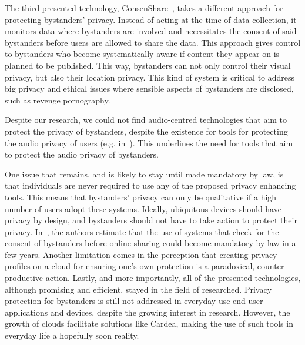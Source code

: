 \documentclass[conference]{IEEEtran}
\begin{document}
The third presented technology, ConsenShare~\cite{olteanu2018consensual}, takes a different approach for protecting bystanders' privacy. Instead of acting at the time of data collection, it monitors data where bystanders are involved and necessitates the consent of said bystanders before users are allowed to share the data. This approach gives control to bystanders who become systematically aware if content they appear on is planned to be published. This way, bystanders can not only control their visual privacy, but also their location privacy. This kind of system is critical to address big privacy and ethical issues where sensible aspects of bystanders are disclosed, such as revenge pornography. 

Despite our research, we could not find audio-centred technologies that aim to protect the privacy of bystanders, despite the existence for tools for protecting the audio privacy of users (e.g. in~\cite{larson2011accurate, ahmed2020preech}). This underlines the need for tools that aim to protect the audio privacy of bystanders. 

One issue that remains, and is likely to stay until made mandatory by law, is that individuals are never required to use any of the proposed privacy enhancing tools. This means that bystanders' privacy can only be qualitative if a high number of users adopt these systems. Ideally, ubiquitous devices should have privacy by design, and bystanders should not have to take action to protect their privacy. In~\cite{olteanu2018consensual}, the authors estimate that the use of systems that check for the consent of bystanders before online sharing could become mandatory by law in a few years. Another limitation comes in the perception that creating privacy profiles on a cloud for ensuring one's own protection is a paradoxical, counter-productive action. Lastly, and more importantly, all of the presented technologies, although promising and efficient, stayed in the field of researched. Privacy protection for bystanders is still not addressed in everyday-use end-user applications and devices, despite the growing interest in research. However, the growth of clouds facilitate solutions like Cardea, making the use of such tools in everyday life a hopefully soon reality.

\end{document}
